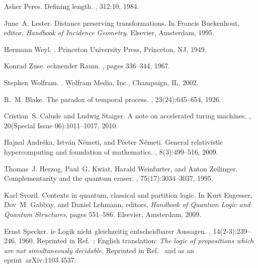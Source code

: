\documentclass[12pt]{article}
\begin{document}
\begin{thebibliography}{10}

Asher Peres.
\newblock Defining length.
, 312:10, 1984.

June~A. Lester.
\newblock Distance preserving transformations.
\newblock In Francis Buekenhout, editor, {\em Handbook of Incidence Geometry}.
  Elsevier, Amsterdam, 1995.

Hermann Weyl.
.
\newblock Princeton University Press, Princeton, NJ, 1949.

Konrad Zuse.
echnender {R}aum.
, pages 336--344, 1967.

Stephen Wolfram.
.
\newblock Wolfram Media, Inc., Champaign, IL, 2002.

R.~M. Blake.
\newblock The paradox of temporal process.
, 23(24):645--654, 1926.

Cristian~S. Calude and Ludwig Staiger.
\newblock A note on accelerated turing machines.
, 20(Special Issue
  06):1011--1017, 2010.

Hajnal Andr{\'{e}}ka, Istv{\'{a}}n N{\'{e}}meti, and P{\'{e}}eter N{\'{e}}meti.
\newblock General relativistic hypercomputing and foundation of mathematics.
, 8(3):499--516, 2009.

Thomas~J. Herzog, Paul~G. Kwiat, Harald Weinfurter, and Anton Zeilinger.
\newblock Complementarity and the quantum eraser.
, 75(17):3034--3037, 1995.

Karl Svozil.
\newblock Contexts in quantum, classical and partition logic.
\newblock In Kurt Engesser, Dov~M. Gabbay, and Daniel Lehmann, editors, {\em
  Handbook of Quantum Logic and Quantum Structures}, pages 551--586. Elsevier,
  Amsterdam, 2009.

Ernst Specker.
ie {L}ogik nicht gleichzeitig entscheidbarer {A}ussagen.
, 14(2-3):239--246, 1960.
\newblock Reprinted in Ref.~\cite[pp. 175--182]{specker-ges}; {E}nglish
  translation: {\it The logic of propositions which are not simultaneously
  decidable}, Reprinted in Ref.~\cite[pp. 135-140]{hooker} and as an
  eprint~arXiv:1103.4537.


\end{thebibliography}
\end{document}
